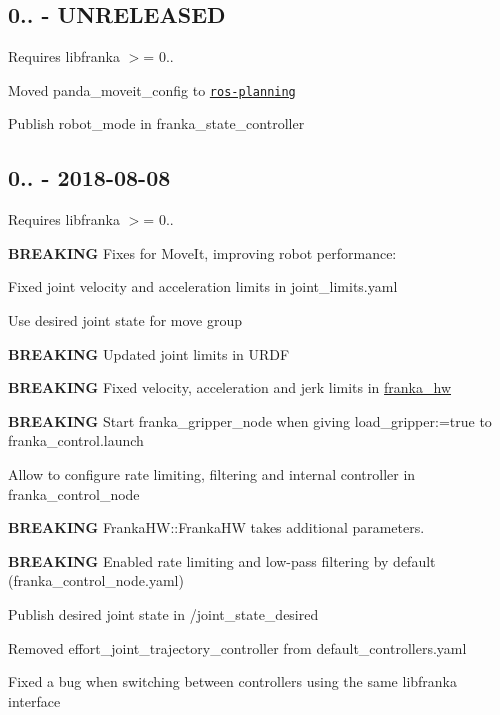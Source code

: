 \subsection*{0.. -\/ U\+N\+R\+E\+L\+E\+A\+S\+ED}

Requires {\ttfamily libfranka} $>$= 0..


\begin{DoxyItemize}
\item Moved {\ttfamily panda\+\_\+moveit\+\_\+config} to \href{https://github.com/ros-planning/panda_moveit_config}{\tt {\ttfamily ros-\/planning}}
\item Publish {\ttfamily robot\+\_\+mode} in {\ttfamily franka\+\_\+state\+\_\+controller}
\end{DoxyItemize}

\subsection*{0.. -\/ 2018-\/08-\/08}

Requires {\ttfamily libfranka} $>$= 0..


\begin{DoxyItemize}
\item {\bfseries B\+R\+E\+A\+K\+I\+NG} Fixes for Move\+It, improving robot performance\+:
\begin{DoxyItemize}
\item Fixed joint velocity and acceleration limits in {\ttfamily joint\+\_\+limits.\+yaml}
\item Use desired joint state for move group
\end{DoxyItemize}
\item {\bfseries B\+R\+E\+A\+K\+I\+NG} Updated joint limits in U\+R\+DF
\item {\bfseries B\+R\+E\+A\+K\+I\+NG} Fixed velocity, acceleration and jerk limits in {\ttfamily \hyperlink{namespacefranka__hw}{franka\+\_\+hw}}
\item {\bfseries B\+R\+E\+A\+K\+I\+NG} Start {\ttfamily franka\+\_\+gripper\+\_\+node} when giving {\ttfamily load\+\_\+gripper\+:=true} to {\ttfamily franka\+\_\+control.\+launch}
\item Allow to configure rate limiting, filtering and internal controller in {\ttfamily franka\+\_\+control\+\_\+node}
\item {\bfseries B\+R\+E\+A\+K\+I\+NG} {\ttfamily Franka\+H\+W\+::\+Franka\+HW} takes additional parameters.
\item {\bfseries B\+R\+E\+A\+K\+I\+NG} Enabled rate limiting and low-\/pass filtering by default ({\ttfamily franka\+\_\+control\+\_\+node.\+yaml})
\item Publish desired joint state in {\ttfamily /joint\+\_\+state\+\_\+desired}
\item Removed {\ttfamily effort\+\_\+joint\+\_\+trajectory\+\_\+controller} from {\ttfamily default\+\_\+controllers.\+yaml}
\item Fixed a bug when switching between controllers using the same {\ttfamily libfranka} interface
\end{DoxyItemize}


